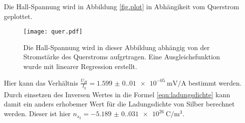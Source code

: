 Die Hall-Spannung wird in Abbildung \ref{fig.plot} in Abhängikeit vom Querstrom geplottet.


\begin{figure}
  \centering
  \texttt{[image: quer.pdf]}
  \caption{Die Hall-Spannung wird in dieser Abbildung abhängig von der Stromstärke des Querstroms aufgrtragen. Eine Ausgleichsfunktion wurde mit linearer Regression erstellt.}
  \label{fig:plot}
\end{figure}

Hier kann das Verhältnis $\frac{U_H}{I_q}=\qty{1.599(0.010)e-05}{\milli\volt\per\ampere}$ bestimmt werden.
Durch einsetzen des Inversen Wertes in die Formel \ref{eqn:ladungsdichte} kann damit ein anders erhobemer Wert für die Ladungsdichte von Silber berechnet werden.
Dieser ist hier $n_{s_2}=\qty{-5.189(0.031)e+26}{\coulomb\per\cubic\meter}$.

